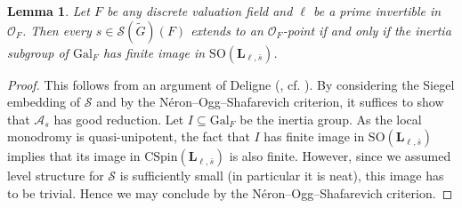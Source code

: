 \documentclass[11pt, letterpaper]{amsart}
\theoremstyle{plain}
\newtheorem{lemma}[theorem]{Lemma}
\theoremstyle{definition}
\newcommand{\<}{\langle}
\renewcommand{\>}{\rangle}
\def\wt{\widetilde}
\newcommand{\sO}{\mathcal{O}}
\newcommand{\Gal}{\mathrm{Gal}}
\newcommand{\shS}{\mathscr{S}}
\newcommand{\sA}{\mathcal{A}}
\newcommand{\bL}{\mathbf{L}}
\newcommand{\SO}{\mathrm{SO}}
\newcommand{\CSpin}{\mathrm{CSpin}}
\begin{document}
\begin{lemma}
\label{lem: NOS}
    Let $F$ be any discrete valuation field and $\ell$ be a prime invertible in $\sO_F$. Then every $s \in \shS(\wt{G})(F)$ extends to an $\sO_F$-point if and only if the inertia subgroup of $\Gal_F$ has finite image in $\mathrm{SO}(\bL_{\ell, \bar{s}})$.   
\end{lemma}
\begin{proof}
    This follows from an argument of Deligne (\cite[\S6.6]{DelK3Weil}, cf. \cite[Lem.~9.3.1]{Andre}). 
    By considering the Siegel embedding of $\shS$ and by the N\'eron--Ogg--Shafarevich criterion, it suffices to show that $\sA_s$ has good reduction. 
    Let $I \subseteq \Gal_F$ be the inertia group. 
    As the local monodromy is quasi-unipotent, the fact that $I$ has finite image in $\SO(\bL_{\ell, \bar{s}})$ implies that its image in $\CSpin(\bL_{\ell, \bar{s}})$ is also finite. 
    However, since we assumed level structure for $\shS$ is sufficiently small (in particular it is neat), this image has to be trivial. Hence we may conclude by the N\'eron--Ogg--Shafarevich criterion. 
\end{proof}
\end{document}
